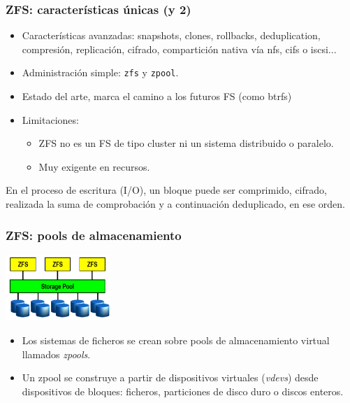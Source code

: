 \documentclass{beamer}
\begin{document}
\begin{frame}
  \frametitle{ZFS: características únicas (y 2)}
  \begin{itemize}
    \item Características avanzadas: snapshots, clones, rollbacks, deduplication, compresión, replicación, cifrado, compartición nativa vía nfs, cifs o iscsi...
    \item  Administración simple: \texttt{zfs} y \texttt{zpool}.
    \item Estado del arte, marca el camino a los futuros FS (como btrfs)
    \item Limitaciones: 
  \begin{itemize}
    \item ZFS no es un FS de tipo cluster ni un sistema distribuido o paralelo.
    \item Muy exigente en recursos.
  \end{itemize}
  \end{itemize}

En el proceso de escritura (I/O), un bloque puede ser comprimido, cifrado, realizada la suma de comprobación y a continuación deduplicado, en ese orden.

\end{frame}

\begin{frame}
  \frametitle{ZFS: pools de almacenamiento}

  \begin{center}
    \includegraphics[height=2.5cm]{figs/zfs_storage_pool.png}
  \end{center}
  \begin{itemize}
    \item Los sistemas de ficheros se crean sobre pools de almacenamiento virtual llamados {\it zpools}.
    \item Un zpool se construye a partir de dispositivos virtuales ({\it vdevs}) desde dispositivos de bloques: ficheros, particiones de disco duro o discos enteros.
  \end{itemize}
\end{frame}
\end{document}
